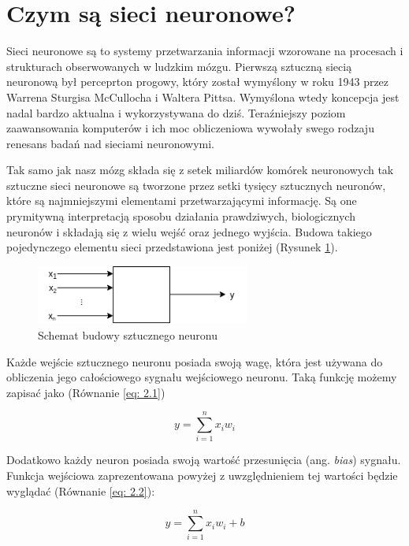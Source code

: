 \documentclass[12pt, oneside, a4paper]{report}
\begin{document}
\section{Czym są sieci neuronowe?}

Sieci neuronowe są to systemy przetwarzania informacji wzorowane na procesach i strukturach obserwowanych w ludzkim mózgu. Pierwszą sztuczną siecią neuronową był perceprton progowy, który został wymyślony w roku 1943 przez Warrena Sturgisa McCullocha i Waltera Pittsa. Wymyślona wtedy koncepcja jest nadal bardzo aktualna i wykorzystywana do dziś. Teraźniejszy poziom zaawansowania komputerów i ich moc obliczeniowa wywołały swego rodzaju renesans badań nad sieciami neuronowymi.

Tak samo jak nasz mózg składa się z setek miliardów komórek neuronowych tak sztuczne sieci neuronowe są tworzone przez setki tysięcy sztucznych neuronów, które są najmniejszymi elementami przetwarzającymi informację. Są one prymitywną interpretacją sposobu działania prawdziwych, biologicznych neuronów i składają się z wielu wejść oraz jednego wyjścia. Budowa takiego pojedynczego elementu sieci przedstawiona jest poniżej (Rysunek \ref{fig: 2.1}).

\begin{figure}[h]
	\centering
	\includegraphics[width=7cm]{fig211.png}
	\caption{Schemat budowy sztucznego neuronu}
	\label{fig: 2.1}
\end{figure}

Każde wejście sztucznego neuronu posiada swoją wagę, która jest używana do obliczenia jego całościowego sygnału wejściowego neuronu. Taką funkcję możemy zapisać jako (Równanie \ref{eq: 2.1})

\begin{equation}\label{eq: 2.1}
y = \sum^{n}_{i=1} x_{i}w_{i}
\end{equation}

Dodatkowo każdy neuron posiada swoją wartość przesunięcia (ang. \textit{bias}) sygnału. Funkcja wejściowa zaprezentowana powyżej z uwzględnieniem tej wartości będzie wyglądać (Równanie \ref{eq: 2.2}):

\begin{equation}\label{eq: 2.2}
  y = \sum^{n}_{i=1} x_{i}w_{i} + b
\end{equation}
\end{document}
